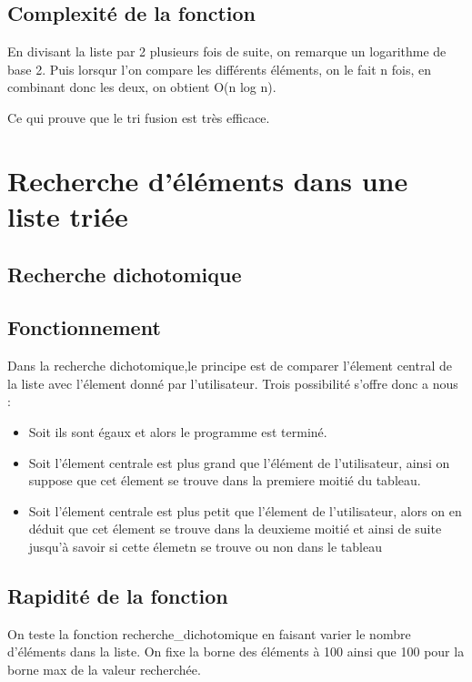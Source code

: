 \documentclass[a4paper, 12pt]{article}
\begin{document}
\subsection{Complexité de la fonction}


En divisant la liste par 2 plusieurs fois de suite, on remarque un logarithme de base 2. 
Puis lorsqur l'on compare les différents éléments, on le fait n fois, en combinant donc les deux, on obtient O(n log n). 

Ce qui prouve que le tri fusion est très efficace. 



\section{Recherche d'éléments dans une
liste triée}



\subsection{Recherche dichotomique}

\subsection{Fonctionnement}
Dans la recherche dichotomique,le principe est de comparer l'élement central de la liste avec l'élement donné par l'utilisateur.
Trois possibilité s'offre donc a nous :
\begin{itemize}
    \item  Soit ils sont égaux et alors le programme est terminé.
    \item Soit l'élement centrale est plus grand que l'élément de l'utilisateur, ainsi on suppose que cet élement se trouve dans la premiere moitié du tableau.
    \item Soit l'élement centrale est plus petit que l'élement de l'utilisateur, alors on en déduit que cet élement se trouve dans la deuxieme moitié et ainsi de suite jusqu'à savoir si cette élemetn se trouve ou non dans le tableau
\end{itemize}

\subsection{Rapidité de la fonction}

On teste la fonction recherche\_dichotomique en faisant varier le nombre d'éléments dans la liste. On fixe la borne des éléments à 100 ainsi que 100 pour la borne max de la valeur recherchée.
\end{document}
